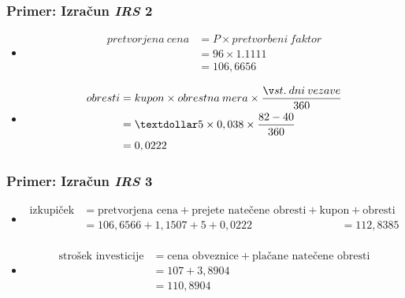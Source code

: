 \documentclass[14pt]{beamer}
\begin{document}
\begin{frame}
    \frametitle{Primer: Izračun \textit{IRS} 2}
    
    \begin{itemize}
        \item
                \begin{align*}
                    pretvorjena\:cena 
                    &= P \times pretvorbeni\:faktor \\
                    &= 96 \times 1.1111 \\
                    &= 106,6656
                \end{align*}
        \item
                \begin{align*}
                    obresti
                    &= kupon \times obrestna\:mera \times \frac{št.\:dni\:vezave}{360} \\
                    &= \textdollar5 \times 0,038 \times \frac{82 - 40}{360} \\
                    &= 0,0222 
                \end{align*}
            
    \end{itemize}

    \note[item]{}

\end{frame}


\begin{frame}
    \frametitle{Primer: Izračun \textit{IRS} 3}
    
    \begin{itemize}
        \item
                \begin{align*}
                    \text{izkupiček} 
                    &= \text{pretvorjena cena} + \text{prejete natečene obresti} + 
                        \text{kupon} + \text{obresti} \\
                    &= 106,6566 + 1,1507 + 5 + 0,0222 
                    &= 112,8385 \\
                \end{align*}
        \item
                \begin{align*}
                    \text{strošek investicije}
                    &= \text{cena obveznice} + \text{plačane natečene obresti} \\
                    &= 107 + 3,8904 \\
                    &=110,8904
                \end{align*}
            
    \end{itemize}

    \note[item]{}

\end{frame}
\end{document}
